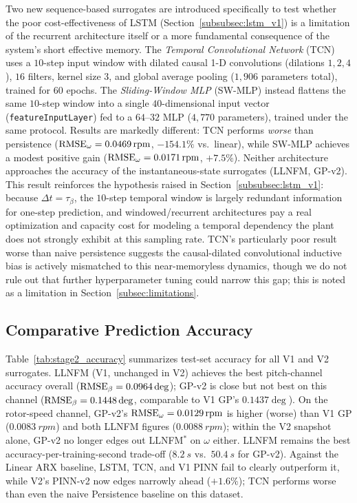 Two new sequence-based surrogates are introduced specifically to test
whether the poor cost-effectiveness of LSTM (Section~\ref{subsubsec:lstm_v1})
is a limitation of the recurrent architecture itself or a more fundamental
consequence of the system's short effective memory. The \emph{Temporal
Convolutional Network} (TCN) uses a $10$-step input window with dilated
causal 1-D convolutions (dilations $1,2,4$), $16$ filters, kernel size
$3$, and global average pooling ($1{,}906$ parameters total), trained for
$60$ epochs. The \emph{Sliding-Window MLP} (SW-MLP) instead flattens the
same $10$-step window into a single $40$-dimensional input vector
(\texttt{featureInputLayer}) fed to a $64$--$32$ MLP ($4{,}770$
parameters), trained under the same protocol. Results are markedly
different: TCN performs \emph{worse} than persistence
($\text{RMSE}_{\omega}=\SI{0.0469}{rpm}$, $-154.1\%$ vs.\ linear), while SW-MLP
achieves a modest positive gain ($\text{RMSE}_{\omega}=\SI{0.0171}{rpm}$,
$+7.5\%$). Neither architecture approaches the accuracy of the
instantaneous-state surrogates (LLNFM, GP-v2). This result reinforces the
hypothesis raised in Section~\ref{subsubsec:lstm_v1}: because
$\Delta t = \tau_\beta$, the $10$-step temporal window is largely redundant
information for one-step prediction, and windowed/recurrent architectures
pay a real optimization and capacity cost for modeling a temporal
dependency the plant does not strongly exhibit at this sampling rate. TCN's
particularly poor result  worse than naive persistence  suggests the
causal-dilated convolutional inductive bias is actively mismatched to this
near-memoryless dynamics, though we do not rule out that further
hyperparameter tuning could narrow this gap; this is noted as a limitation
in Section~\ref{subsec:limitations}.

\subsection{Comparative Prediction Accuracy}
\label{subsec:comparative_accuracy}

Table~\ref{tab:stage2_accuracy} summarizes test-set accuracy for all
V1 and V2 surrogates. LLNFM (V1, unchanged in V2) achieves the best
pitch-channel accuracy overall ($\text{RMSE}_{\beta}=0.0964\deg$); GP-v2 is
close but not best on this channel ($\text{RMSE}_{\beta}=0.1448\deg$,
comparable to V1 GP's $0.1437\deg$). On the rotor-speed channel, GP-v2's
$\text{RMSE}_{\omega}=\SI{0.0129}{rpm}$ is higher (worse) than V1 GP
($\SI{0.0083}{rpm}$) and both LLNFM figures ($\SI{0.0088}{rpm}$);
within the V2 snapshot alone, GP-v2 no longer edges out
LLNFM$^{*}$ on $\omega$ either. LLNFM remains the best
accuracy-per-training-second trade-off ($\SI{8.2}{s}$ vs.\
$\SI{50.4}{s}$ for GP-v2). Against the Linear ARX baseline, LSTM, TCN,
and V1 PINN fail to clearly outperform it, while V2's PINN-v2 now
edges narrowly ahead ($+1.6\%$); TCN performs worse than even the
naive Persistence baseline on this dataset.

